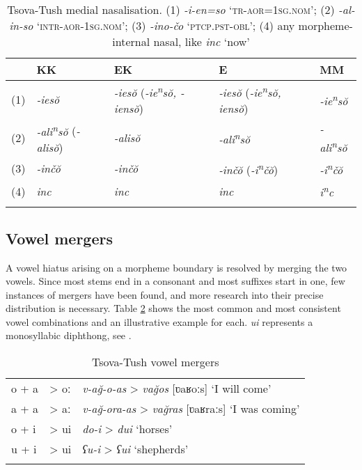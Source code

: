 \begin{table}
	\begin{tabular}{lllll}
    \lsptoprule
		& {KK} & {EK} & {E} & {MM} \\
        \midrule
		(1) & \textit{-ies\u{o}} & \textit{-ies\u{o}} (\textit{-ie\textsuperscript{n}s\u{o}, -iens\u{o}}) & \textit{-ies\u{o}} (\textit{-ie\textsuperscript{n}s\u{o}, iens\u{o}}) & \textit{-ie\textsuperscript{n}s\u{o}} \\
		
		(2) & \textit{-ali\textsuperscript{n}s\u{o}} (\textit{-alis\u{o}}) & \textit{-alis\u{o}} & \textit{-ali\textsuperscript{n}s\u{o}} & \textit{-ali\textsuperscript{n}s\u{o}} \\
		
		(3) & \textit{-inč\u{o}} & \textit{-inč\u{o}} & \textit{-inč\u{o}} (\textit{-i\textsuperscript{n}č\u{o}}) & \textit{-i\textsuperscript{n}č\u{o}} \\
		
		(4) & \textit{inc} & \textit{inc} & \textit{inc} & \textit{i\textsuperscript{n}c} \\
		\lspbottomrule
		
		
	\end{tabular}
	\caption{Tsova-Tush medial nasalisation. (1) \textit{-i-en=so} `\textsc{tr-aor=1sg.nom}'; (2) \textit{-al-in-so} `\textsc{intr-aor-1sg.nom}'; (3) \textit{-ino-čo}  `\textsc{ptcp.pst-obl}'; (4) any morpheme-internal nasal, like \textit{inc} `now'}
	\label{table-nasal2}
\end{table}



\subsection{Vowel mergers}

A vowel hiatus arising on a morpheme boundary is resolved by merging the two vowels. Since most stems end in a consonant and most suffixes start in one, few instances of mergers have been found, and more research into their precise distribution is necessary. Table \ref{phon-table2} shows the most common and most consistent vowel combinations and an illustrative example for each. \textit{ui} represents a monosyllabic diphthong, see .

\begin{table}
	\begin{tabular}{lll}
		\lsptoprule
		o + a & > oː & \textit{v-a\u{g}-o-as} > \textit{va\u{g}os} [ʋaʁoːs] `I will come' \\
		a + a & > aː & \textit{v-a\u{g}-ora-as} > \textit{va\u{g}ras} [ʋaʁraːs] `I was coming' \\
		
		o + i & > ui & \textit{do-i} > \textit{dui} `horses' \\
		u + i & > ui & \textit{ʕu-i} > \textit{ʕui} `shepherds' \\
		\lspbottomrule
	\end{tabular}
	\caption{Tsova-Tush vowel mergers}
	\label{phon-table2}
\end{table}


